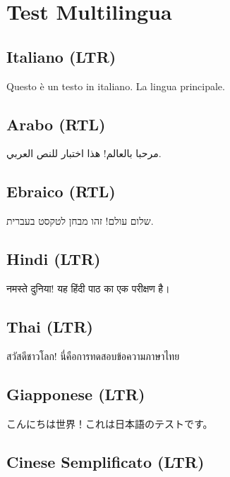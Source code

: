 \documentclass[12pt]{article}
\begin{document}
\section*{Test Multilingua}

\subsection*{Italiano (LTR)}
Questo è un testo in italiano. La lingua principale.

\subsection*{Arabo (RTL)}
\textarabic{مرحبا بالعالم! هذا اختبار للنص العربي.}

\subsection*{Ebraico (RTL)}
\texthebrew{שלום עולם! זהו מבחן לטקסט בעברית.}

\subsection*{Hindi (LTR)}
\texthindi{नमस्ते दुनिया! यह हिंदी पाठ का एक परीक्षण है।}

\subsection*{Thai (LTR)}
\textthai{สวัสดีชาวโลก! นี่คือการทดสอบข้อความภาษาไทย}

\subsection*{Giapponese (LTR)}
\textjapanese{こんにちは世界！これは日本語のテストです。}

\subsection*{Cinese Semplificato (LTR)}
\end{document}
